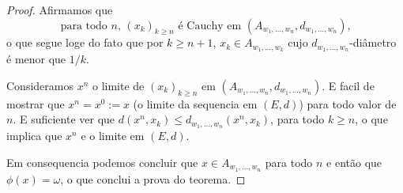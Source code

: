 \begin{proof}
  Afirmamos que
  \begin{equation}
    \text{para todo $n$, $(x_k)_{k \geq n}$ é Cauchy em $(A_{w_1, \dots, w_n}, d_{w_1, \dots, w_n})$,}
  \end{equation}
 o que segue loge do fato que por $k \geq n+1$, $x_k \in A_{w_1, \dots, w_{k}}$ cujo $d_{w_1, \dots, w_{n}}$-diâmetro é menor que $1/k$.

 \medskip

 Consideramos $x^n$ o limite de $(x_k)_{k\ge n}$ em $(A_{w_1, \dots, w_n}, d_{w_1, \dots, w_n})$.
 E facil de mostrar que $x^n=x^0:=x$ (o limite da sequencia em $(E,d)$) para todo valor de $n$.
 E suficiente ver que  $d(x^n,x_k)\le d_{w_1, \dots, w_n}(x^n,x_k)$, para todo $k\ge n$, o que implica que $x^n$ e o limite em $(E,d)$.

 \medskip

 Em consequencia podemos concluir que $x\in A_{w_1, \dots, w_n}$ para todo $n$ e então que $\phi(x)=\omega$, o que conclui a prova do teorema.
\end{proof}

